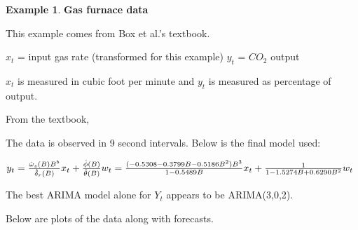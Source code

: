 \documentclass[
]{book}
\theoremstyle{definition}
\theoremstyle{definition}
\newtheorem{example}{Example}[chapter]
\theoremstyle{definition}
\theoremstyle{definition}
\theoremstyle{remark}
\begin{document}
\begin{example}
\textbf{Gas furnace data}

This example comes from Box et al.'s textbook.

\(x_t\) = input gas rate (transformed for this example)
\(y_t\) = \(CO_2\) output

\(x_t\) is measured in cubic foot per minute and \(y_t\) is measured as percentage of output.

From the textbook,

The data is observed in 9 second intervals. Below is the final model used:

\(y_t=\frac{\hat \omega_s(B)B^b}{\hat \delta_r(B)}x_t+\frac{\hat \phi(B)}{\hat \theta(B)}w_t\\=\frac{(-0.5308-0.3799B-0.5186B^2)B^3}{1-0.5489B}x_t+\frac{1}{1-1.5274B+0.6290B^2}w_t\)

The best ARIMA model alone for \(Y_t\) appears to be ARIMA(3,0,2).

Below are plots of the data along with forecasts.
\end{example}

  
\end{document}
